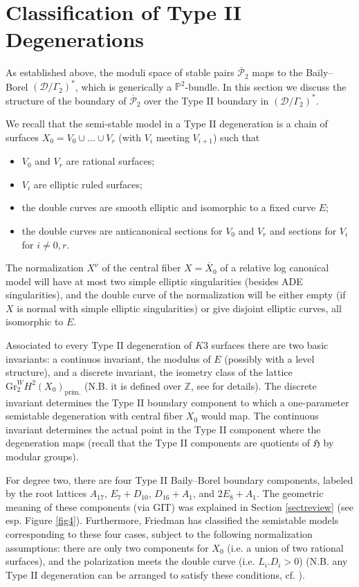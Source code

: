 \documentclass{amsart}
\numberwithin{equation}{section}
\theoremstyle{plain}
\theoremstyle{remark}
\theoremstyle{definition}
\newcommand{\bP}{\mathbb{P}}
\newcommand{\bZ}{\mathbb{Z}}
\newcommand{\fH}{\mathfrak{H}}
\newcommand{\calP}{\mathcal{P}}
\newcommand{\calD}{\mathcal{D}}
\newcommand{\Gr}{\mathrm{Gr}}
\begin{document}

\section{Classification of Type II Degenerations}\label{secttype2}
As established above, the moduli space of stable pairs $\overline{\calP}_2$ maps to the Baily--Borel $(\calD/\Gamma_2)^*$, which is generically a $\bP^2$-bundle. In this section we discuss the structure of the boundary of $\overline{\calP}_2$ over the Type II boundary in $(\calD/\Gamma_2)^*$. 

We recall that the semi-stable model in a Type II degeneration is a chain of surfaces $X_0=V_0\cup \dots\cup V_r$ (with $V_i$ meeting $V_{i+1}$) such that 
\begin{itemize}
\item $V_0$ and $V_r$ are rational surfaces;
\item $V_i$ are elliptic ruled surfaces;
\item the double curves are smooth elliptic and isomorphic to a fixed  curve $E$;
\item the double curves are anticanonical sections for $V_0$ and $V_r$ and sections for $V_i$ for $i\neq 0,r$. 
\end{itemize}
The normalization $X^\nu$ of the central fiber $X=\overline X_0$ of a relative log canonical model will have at most two simple elliptic singularities (besides ADE singularities), and the double curve of the normalization will be either empty (if $X$ is normal with simple elliptic singularities) or give disjoint elliptic curves, all isomorphic to $E$.  

Associated to every Type II degeneration of $K3$ surfaces there are two basic invariants: a continuos invariant, the modulus of $E$ (possibly with a level structure), and a discrete invariant, the isometry class of the lattice $\Gr^W_2H^2(X_0)_{\textrm{prim.}}$ (N.B. it is defined over $\bZ$, see \cite[\S3]{friedmanannals} for details). The discrete invariant determines the Type II boundary component to which a one-parameter semistable degeneration with central fiber $X_0$ would map. The continuous invariant determines the actual point in the Type II component where the degeneration maps (recall that the Type II components are quotients of $\fH$ by modular groups). 

For degree two, there are four Type II Baily--Borel boundary components,  labeled by the root lattices $A_{17}$, $E_7+D_{10}$, $D_{16}+A_1$, and $2E_8+ A_1$. The geometric meaning of these components (via GIT) was explained in Section \ref{sectreview} (see esp. Figure \ref{fig4}). Furthermore, Friedman \cite[Thm. 5.4]{friedmanannals} has classified the semistable models corresponding to these four cases, subject to the following normalization assumptions: there are only two components for $X_0$ (i.e.  a union of two rational surfaces), and the polarization meets the double curve (i.e. $L_i.D_i>0$) (N.B. any Type II degeneration can be arranged to satisfy these conditions, cf. \cite[Thm. 2.2]{friedmanannals}). 
\end{document}
